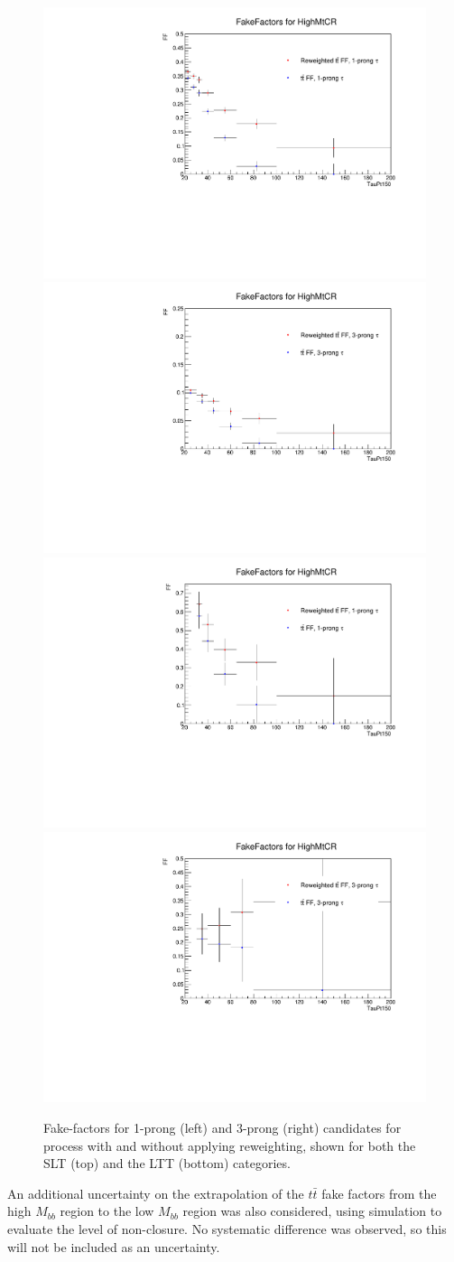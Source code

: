 \begin{figure}[!h]
\centering
\includegraphics[width=.45\textwidth]{figures/systs/datadriven_lephadfakes/SLT/FFRWUnc_1prong_SLT.pdf}
\includegraphics[width=.45\textwidth]{figures/systs/datadriven_lephadfakes/SLT/FFRWUnc_3prong_SLT.pdf} \\
\includegraphics[width=.45\textwidth]{figures/systs/datadriven_lephadfakes/LTT/FFRWUnc_1prong_LTT.pdf}
\includegraphics[width=.45\textwidth]{figures/systs/datadriven_lephadfakes/LTT/FFRWUnc_3prong_LTT.pdf} \\
\caption{Fake-factors for 1-prong (left) and 3-prong (right) \tauhad candidates for \ttbar process with and without applying \ttbar reweighting, shown for both the \lephad SLT (top) and the \lephad LTT (bottom) categories.}
\label{fig:FFRW}
\end{figure}

An additional uncertainty on the extrapolation of the $t\bar{t}$ fake factors from the high $M_{bb}$ region to the low $M_{bb}$ region was also considered, using simulation to evaluate the level of non-closure.  No systematic difference was observed, so this will not be included as an uncertainty.
